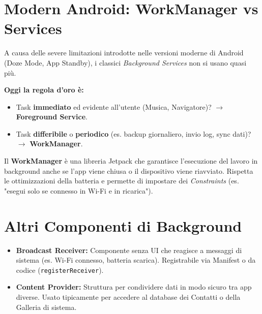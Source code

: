 \section{Modern Android: WorkManager vs Services}
A causa delle severe limitazioni introdotte nelle versioni moderne di Android (Doze Mode, App Standby), i
classici \textit{Background Services} non si usano quasi più.

\textbf{Oggi la regola d'oro è:}
\begin{itemize}
    \item Task \textbf{immediato} ed evidente all'utente (Musica, Navigatore)? $\rightarrow$ \textbf{Foreground Service}.
    \item Task \textbf{differibile} o \textbf{periodico} (es. backup giornaliero, invio log, sync dati)? $\rightarrow$ \textbf{WorkManager}.
\end{itemize}

Il \textbf{WorkManager} è una libreria Jetpack che garantisce l'esecuzione del lavoro in background anche se l'app viene
chiusa o il dispositivo viene riavviato.
Rispetta le ottimizzazioni della batteria e permette di impostare dei \textit{Constraints} (es. "esegui solo se connesso in Wi-Fi e in ricarica").

\section{Altri Componenti di Background}
\begin{itemize}
    \item \textbf{Broadcast Receiver:} Componente senza UI che reagisce a messaggi di sistema (es.
    Wi-Fi connesso, batteria scarica).
    Registrabile via Manifest o da codice (\texttt{registerReceiver}).
    \item \textbf{Content Provider:} Struttura per condividere dati in modo sicuro tra app diverse.
    Usato tipicamente per accedere al database dei Contatti o della Galleria di sistema.
\end{itemize}